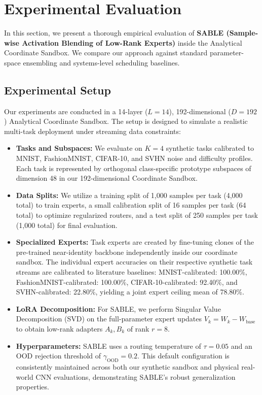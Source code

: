 \section{Experimental Evaluation}
\label{sec:experiments}

In this section, we present a thorough empirical evaluation of \textbf{SABLE (Sample-wise Activation Blending of Low-Rank Experts)} inside the Analytical Coordinate Sandbox. We compare our approach against standard parameter-space ensembling and systems-level scheduling baselines.

\subsection{Experimental Setup}
Our experiments are conducted in a 14-layer ($L=14$), 192-dimensional ($D=192$) Analytical Coordinate Sandbox. The setup is designed to simulate a realistic multi-task deployment under streaming data constraints:
\begin{itemize}
    \item \textbf{Tasks and Subspaces:} We evaluate on $K=4$ synthetic tasks calibrated to MNIST, FashionMNIST, CIFAR-10, and SVHN noise and difficulty profiles. Each task is represented by orthogonal class-specific prototype subspaces of dimension 48 in our 192-dimensional Coordinate Sandbox.
    \item \textbf{Data Splits:} We utilize a training split of 1,000 samples per task (4,000 total) to train experts, a small calibration split of 16 samples per task (64 total) to optimize regularized routers, and a test split of 250 samples per task (1,000 total) for final evaluation.
    \item \textbf{Specialized Experts:} Task experts are created by fine-tuning clones of the pre-trained near-identity backbone independently inside our coordinate sandbox. The individual expert accuracies on their respective synthetic task streams are calibrated to literature baselines: MNIST-calibrated: 100.00\%, FashionMNIST-calibrated: 100.00\%, CIFAR-10-calibrated: 92.40\%, and SVHN-calibrated: 22.80\%, yielding a joint expert ceiling mean of 78.80\%.
    \item \textbf{LoRA Decomposition:} For SABLE, we perform Singular Value Decomposition (SVD) on the full-parameter expert updates $V_k = W_k - W_{\text{base}}$ to obtain low-rank adapters $A_k, B_k$ of rank $r=8$.
    \item \textbf{Hyperparameters:} SABLE uses a routing temperature of $\tau = 0.05$ and an OOD rejection threshold of $\gamma_{\text{OOD}} = 0.2$. This default configuration is consistently maintained across both our synthetic sandbox and physical real-world CNN evaluations, demonstrating SABLE's robust generalization properties.
\end{itemize}

